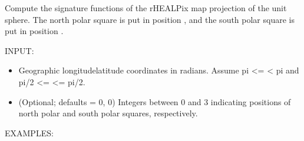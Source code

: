 \documentclass[a4paper,12ptopenany,oneside,english]{sphinxmanual}
\begin{document}
\begin{fulllineitems}
\label{\detokenize{pj_rhealpix:rhealpixdggs.pj_rhealpix.rhealpix_sphere}}
\pysigstartsignatures
{}
\pysigstopsignatures
\sphinxAtStartPar
Compute the signature functions of the rHEALPix map projection of
the unit sphere.
The north polar square is put in position , and the
south polar square is put in position .

\sphinxAtStartPar
INPUT:
\begin{itemize}
\item {} 
\sphinxAtStartPar
{} \sphinxhyphen{}Geographic longitude\sphinxhyphen{}latitude coordinates in radians.
Assume \sphinxhyphen{}pi \textless{}=  \textless{} pi and \sphinxhyphen{}pi/2 \textless{}=  \textless{}= pi/2.

\item {} 
\sphinxAtStartPar
{} \sphinxhyphen{} (Optional; defaults = 0, 0) Integers
between 0 and 3 indicating positions of north polar and
south polar squares, respectively.

\end{itemize}

\sphinxAtStartPar
EXAMPLES:

\begin{sphinxVerbatim}[commandchars=\\\{\}]
  
\end{sphinxVerbatim}


\end{fulllineitems}
\end{document}
